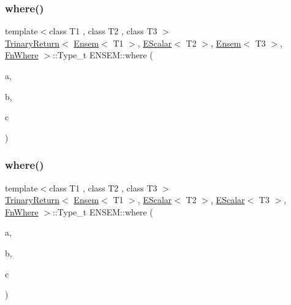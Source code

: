 \mbox{\label{group__eensem_ga8e810f6bd36674024a877b4ff879c3fe}} 
\subsubsection{\texorpdfstring{where()}{where()}\hspace{0.1cm}{\footnotesize\ttfamily [3/7]}}
{\footnotesize\ttfamily template$<$class T1 , class T2 , class T3 $>$ \\
\mbox{\hyperlink{structENSEM_1_1TrinaryReturn}{Trinary\+Return}}$<$ \mbox{\hyperlink{classENSEM_1_1Ensem}{Ensem}}$<$ T1 $>$, \mbox{\hyperlink{classENSEM_1_1EScalar}{E\+Scalar}}$<$ T2 $>$, \mbox{\hyperlink{classENSEM_1_1Ensem}{Ensem}}$<$ T3 $>$, \mbox{\hyperlink{structENSEM_1_1FnWhere}{Fn\+Where}} $>$\+::Type\+\_\+t E\+N\+S\+E\+M\+::where (\begin{DoxyParamCaption}\item[{const \mbox{\hyperlink{classENSEM_1_1Ensem}{Ensem}}$<$ T1 $>$ \&}]{a,  }\item[{const \mbox{\hyperlink{classENSEM_1_1EScalar}{E\+Scalar}}$<$ T2 $>$ \&}]{b,  }\item[{const \mbox{\hyperlink{classENSEM_1_1Ensem}{Ensem}}$<$ T3 $>$ \&}]{c }\end{DoxyParamCaption})\hspace{0.3cm}{\ttfamily [inline]}}

\mbox{\label{group__eensem_ga16076c28e8993bb0aad6e627a1f0b018}} 
\subsubsection{\texorpdfstring{where()}{where()}\hspace{0.1cm}{\footnotesize\ttfamily [4/7]}}
{\footnotesize\ttfamily template$<$class T1 , class T2 , class T3 $>$ \\
\mbox{\hyperlink{structENSEM_1_1TrinaryReturn}{Trinary\+Return}}$<$ \mbox{\hyperlink{classENSEM_1_1Ensem}{Ensem}}$<$ T1 $>$, \mbox{\hyperlink{classENSEM_1_1EScalar}{E\+Scalar}}$<$ T2 $>$, \mbox{\hyperlink{classENSEM_1_1EScalar}{E\+Scalar}}$<$ T3 $>$, \mbox{\hyperlink{structENSEM_1_1FnWhere}{Fn\+Where}} $>$\+::Type\+\_\+t E\+N\+S\+E\+M\+::where (\begin{DoxyParamCaption}\item[{const \mbox{\hyperlink{classENSEM_1_1Ensem}{Ensem}}$<$ T1 $>$ \&}]{a,  }\item[{const \mbox{\hyperlink{classENSEM_1_1EScalar}{E\+Scalar}}$<$ T2 $>$ \&}]{b,  }\item[{const \mbox{\hyperlink{classENSEM_1_1EScalar}{E\+Scalar}}$<$ T3 $>$ \&}]{c }\end{DoxyParamCaption})\hspace{0.3cm}{\ttfamily [inline]}}

